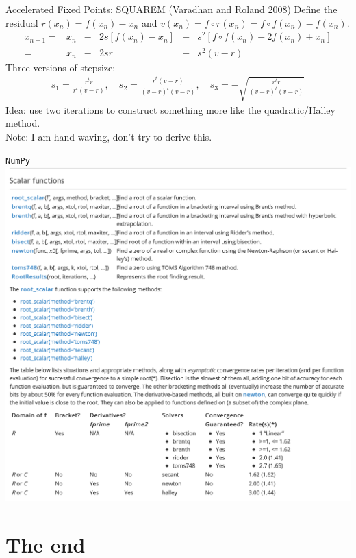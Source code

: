 \documentclass[xcolor=pdftex,dvipsnames,table,mathserif,aspectratio=169]{beamer}
\begin{document}
\begin{frame}{Accelerated Fixed Points: SQUAREM (Varadhan and Roland 2008)}
Define the residual $r(x_n) = f(x_n) - x_n$ and $v(x_n)=f \circ r \left(x_{n}\right)=f \circ f \left(x_{n}\right)-f\left(x_{n}\right)$.
\begin{align*}
x_{n+1}=& x_{n}&-&2 s\left[f\left(x_{n}\right)-x_{n}\right] &+&s^{2}\left[f \circ f\left(x_{n}\right)-2 f\left(x_{n}\right)+x_{n}\right] \\
=& x_{n}&-&2 s r &+&s^{2}(v-r)
\end{align*}
Three versions of stepsize:
\begin{align*}
s_1 =\frac{r^{t} r}{r^{t}(v-r)}, \quad
s_2 =\frac{r^{t}(v-r)}{(v-r)^{t}(v-r)}, \quad
s_3 =-\sqrt{\frac{r^{t} r}{(v-r)^{t}(v-r)}}
\end{align*}
Idea: use two iterations to construct something more like the quadratic/Halley method.\\
\alert{Note: I am hand-waving, don't try to derive this.}
\end{frame}


\begin{frame}{\texttt{NumPy}}
\includegraphics[height=0.9\textheight]{./resources/scipy_roots1.png}
\end{frame}
\section{The end}
\end{document}
